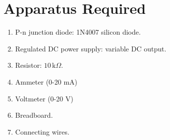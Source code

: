 \section{Apparatus Required}

\begin{enumerate}
    \item P-n junction diode: 1N4007 silicon diode.
    \item Regulated DC power supply: variable DC output.
    \item Resistor: $10\,\text{k}\Omega$.
    \item Ammeter (0-20 mA)
    \item Voltmeter (0-20 V)
    \item Breadboard.
    \item Connecting wires.
\end{enumerate}
